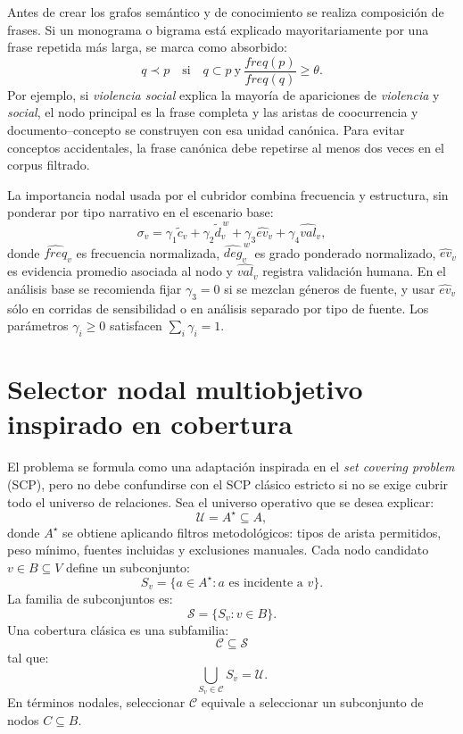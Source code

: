 \documentclass[11pt]{article}
\begin{document}
Antes de crear los grafos semántico y de conocimiento se realiza composición de
frases. Si un monograma o bigrama está explicado mayoritariamente por una frase
repetida más larga, se marca como absorbido:
\[
q \prec p
\quad \text{si}\quad
q \subset p
\ \text{y}\ 
\frac{freq(p)}{freq(q)}\geq \theta.
\]
Por ejemplo, si \textit{violencia social} explica la mayoría de apariciones de
\textit{violencia} y \textit{social}, el nodo principal es la frase completa y
las aristas de coocurrencia y documento--concepto se construyen con esa unidad
canónica. Para evitar conceptos accidentales, la frase canónica debe repetirse
al menos dos veces en el corpus filtrado.

La importancia nodal usada por el cubridor combina frecuencia y estructura, sin
ponderar por tipo narrativo en el escenario base:
\[
\sigma_v =
\gamma_1\widetilde{c}_v+
\gamma_2\widetilde{d}^{\,w}_v+
\gamma_3\widehat{ev}_v+
\gamma_4\widehat{val}_v,
\]
donde $\widehat{freq}_v$ es frecuencia normalizada, $\widehat{deg}^{\,w}_v$ es
grado ponderado normalizado, $\widehat{ev}_v$ es evidencia promedio asociada al
nodo y $\widehat{val}_v$ registra validación humana. En el análisis base se
recomienda fijar \(\gamma_3=0\) si se mezclan géneros de fuente, y usar
\(\widehat{ev}_v\) sólo en corridas de sensibilidad o en análisis separado por
tipo de fuente. Los parámetros $\gamma_i\geq 0$ satisfacen $\sum_i\gamma_i=1$.

\section{Selector nodal multiobjetivo inspirado en cobertura}

El problema se formula como una adaptación inspirada en el \textit{set covering
problem} (SCP), pero no debe confundirse con el SCP clásico estricto si no se
exige cubrir todo el universo de relaciones. Sea el universo operativo que se
desea explicar:
\[
{\mathcal U}=A^\star\subseteq A,
\]
donde $A^\star$ se obtiene aplicando filtros metodológicos: tipos de arista
permitidos, peso mínimo, fuentes incluidas y exclusiones manuales. Cada nodo
candidato $v\in B\subseteq V$ define un subconjunto:
\[
S_v=\{a\in A^\star: a \text{ es incidente a } v\}.
\]
La familia de subconjuntos es:
\[
{\mathcal S}=\{S_v:v\in B\}.
\]
Una cobertura clásica es una subfamilia:
\[
{\mathcal C}\subseteq{\mathcal S}
\]
tal que:
\[
\bigcup_{S_v\in{\mathcal C}}S_v={\mathcal U}.
\]
En términos nodales, seleccionar ${\mathcal C}$ equivale a seleccionar un
subconjunto de nodos $C\subseteq B$.
\end{document}
